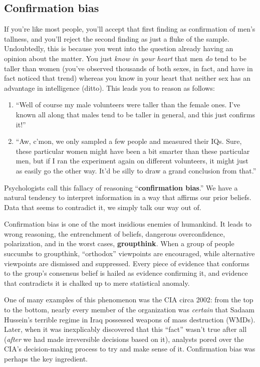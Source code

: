 \subsection{Confirmation bias}


If you're like most people, you'll accept that first finding as confirmation of
men's tallness, and you'll reject the second finding as just a fluke of the
sample. Undoubtedly, this is because you went into the question already having
an opinion about the matter. You just \textit{know in your heart} that men
\textit{do} tend to be taller than women (you've observed thousands of both
sexes, in fact, and have in fact noticed that trend) whereas you know in your
heart that neither sex has an advantage in intelligence (ditto). This leads you
to reason as follows:

\begin{enumerate}[nosep]
\item ``Well of course my male volunteers were taller than the female ones.
I've known all along that males tend to be taller in general, and this just
confirms it!''
\item ``Aw, c'mon, we only sampled a few people and measured their IQs. Sure,
these particular women might have been a bit smarter than these particular men,
but if I ran the experiment again on different volunteers, it might just as
easily go the other way. It'd be silly to draw a grand conclusion from that.''
\end{enumerate}

Psychologists call this fallacy of reasoning ``\textbf{confirmation bias}.'' We
have a natural tendency to interpret information in a way that affirms our
prior beliefs. Data that seems to contradict it, we simply talk our way out of.


Confirmation bias is one of the most insidious enemies of humankind. It leads
to wrong reasoning, the entrenchment of beliefs, dangerous overconfidence,
polarization, and in the worst cases, \textbf{groupthink}. When a group of
people succumbs to groupthink, ``orthodox'' viewpoints are encouraged, while
alternative viewpoints are dismissed and suppressed. Every piece of evidence
that conforms to the group's consensus belief is hailed as evidence confirming
it, and evidence that contradicts it is chalked up to mere statistical anomaly.


One of many examples of this phenomenon was the CIA circa 2002: from the top to
the bottom, nearly every member of the organization was \textit{certain} that
Sadaam Hussein's terrible regime in Iraq possessed weapons of mass destruction
(WMDs). Later, when it was inexplicably discovered that this ``fact'' wasn't
true after all (\textit{after} we had made irreversible decisions based on it),
analysts pored over the CIA's decision-making process to try and make sense of
it. Confirmation bias was perhaps the key ingredient.

